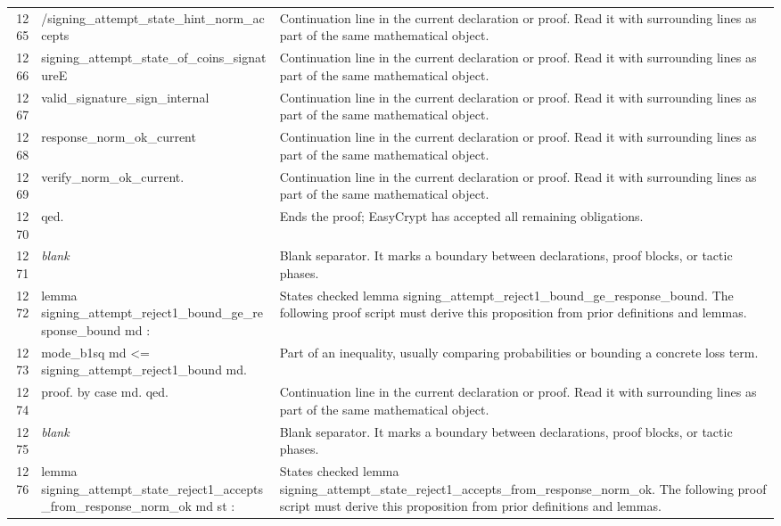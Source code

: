 \documentclass[10pt]{article}
\begin{document}
\begin{longtable}{r L{0.53\textwidth} L{0.37\textwidth}}
1265 & {\ttfamily\scriptsize            /signing\_attempt\_state\_hint\_norm\_accepts} & Continuation line in the current declaration or proof.  Read it with surrounding lines as part of the same mathematical object. \\
1266 & {\ttfamily\scriptsize            signing\_attempt\_state\_of\_coins\_signatureE} & Continuation line in the current declaration or proof.  Read it with surrounding lines as part of the same mathematical object. \\
1267 & {\ttfamily\scriptsize            valid\_signature\_sign\_internal} & Continuation line in the current declaration or proof.  Read it with surrounding lines as part of the same mathematical object. \\
1268 & {\ttfamily\scriptsize            response\_norm\_ok\_current} & Continuation line in the current declaration or proof.  Read it with surrounding lines as part of the same mathematical object. \\
1269 & {\ttfamily\scriptsize            verify\_norm\_ok\_current.} & Continuation line in the current declaration or proof.  Read it with surrounding lines as part of the same mathematical object. \\
1270 & {\ttfamily\scriptsize qed.} & Ends the proof; EasyCrypt has accepted all remaining obligations. \\
1271 & {\ttfamily\scriptsize \emph{blank}} & Blank separator.  It marks a boundary between declarations, proof blocks, or tactic phases. \\
1272 & {\ttfamily\scriptsize lemma signing\_attempt\_reject1\_bound\_ge\_response\_bound md :} & States checked lemma signing\_attempt\_reject1\_bound\_ge\_response\_bound.  The following proof script must derive this proposition from prior definitions and lemmas. \\
1273 & {\ttfamily\scriptsize   mode\_b1sq md <= signing\_attempt\_reject1\_bound md.} & Part of an inequality, usually comparing probabilities or bounding a concrete loss term. \\
1274 & {\ttfamily\scriptsize proof. by case md. qed.} & Continuation line in the current declaration or proof.  Read it with surrounding lines as part of the same mathematical object. \\
1275 & {\ttfamily\scriptsize \emph{blank}} & Blank separator.  It marks a boundary between declarations, proof blocks, or tactic phases. \\
1276 & {\ttfamily\scriptsize lemma signing\_attempt\_state\_reject1\_accepts\_from\_response\_norm\_ok md st :} & States checked lemma signing\_attempt\_state\_reject1\_accepts\_from\_response\_norm\_ok.  The following proof script must derive this proposition from prior definitions and lemmas. \\

\end{longtable}
\end{document}
